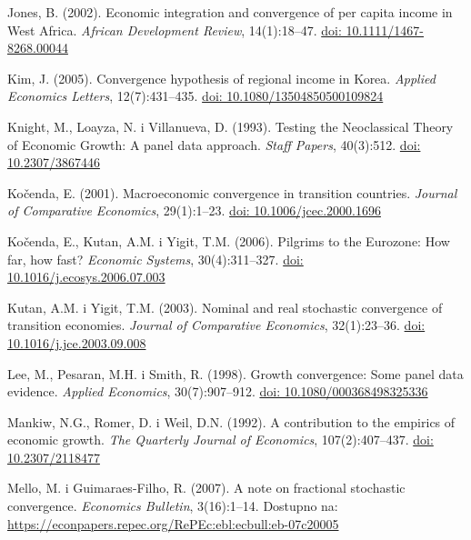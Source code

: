 \documentclass{crebsshr}
\begin{document}
\begin{thebibliography}{99}
Jones, B. (2002). Economic integration and convergence of per capita income in West Africa.
\emph{African Development Review}, 14(1):18--47.
\href{https://doi.org/10.1111/1467-8268.00044}{doi: 10.1111/1467-8268.00044}

Kim, J. (2005). Convergence hypothesis of regional income in Korea.
\emph{Applied Economics Letters}, 12(7):431--435.
\href{https://doi.org/10.1080/13504850500109824}{doi: 10.1080/13504850500109824}

Knight, M., Loayza, N. i Villanueva, D. (1993). Testing the Neoclassical Theory
of Economic Growth: A panel data approach.
\emph{Staff Papers}, 40(3):512.
\href{https://doi.org/10.2307/3867446}{doi: 10.2307/3867446}

Kočenda, E. (2001). Macroeconomic convergence in transition countries.
\emph{Journal of Comparative Economics}, 29(1):1--23.
\href{https://doi.org/10.1006/jcec.2000.1696}{doi: 10.1006/jcec.2000.1696}

Kočenda, E., Kutan, A.M. i Yigit, T.M. (2006). Pilgrims to the Eurozone:
How far, how fast?
\emph{Economic Systems}, 30(4):311--327.
\href{https://doi.org/10.1016/j.ecosys.2006.07.003}{doi: 10.1016/j.ecosys.2006.07.003}

Kutan, A.M. i Yigit, T.M. (2003). Nominal and real stochastic convergence
of transition economies.
\emph{Journal of Comparative Economics}, 32(1):23--36.
\href{https://doi.org/10.1016/j.jce.2003.09.008}{doi: 10.1016/j.jce.2003.09.008}

Lee, M., Pesaran, M.H. i Smith, R. (1998). Growth convergence:
Some panel data evidence.
\emph{Applied Economics}, 30(7):907--912.
\href{https://doi.org/10.1080/000368498325336}{doi: 10.1080/000368498325336}

Mankiw, N.G., Romer, D. i Weil, D.N. (1992). A contribution to the empirics of economic growth.
\emph{The Quarterly Journal of Economics}, 107(2):407--437.
\href{https://doi.org/10.2307/2118477}{doi: 10.2307/2118477}

Mello, M. i Guimaraes-Filho, R. (2007). A note on fractional stochastic convergence.
\emph{Economics Bulletin}, 3(16):1--14.
Dostupno na: \url{https://econpapers.repec.org/RePEc:ebl:ecbull:eb-07c20005}


\end{thebibliography}
\end{document}
